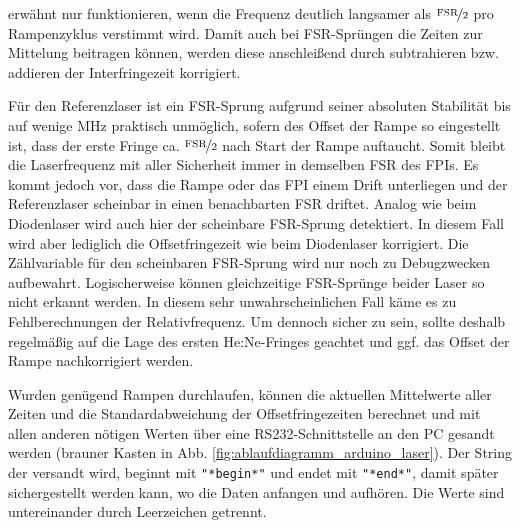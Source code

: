erwähnt nur funktionieren, wenn die Frequenz deutlich langsamer als
$\nicefrac{\text{FSR}}{2}$ pro Rampenzyklus verstimmt wird. Damit auch bei
FSR-Sprüngen die Zeiten zur Mittelung beitragen können, werden diese anschleißend durch subtrahieren bzw. addieren der Interfringezeit korrigiert.\par
Für den Referenzlaser ist ein FSR-Sprung aufgrund seiner absoluten Stabilität
bis auf wenige MHz praktisch unmöglich, sofern des Offset der Rampe so
eingestellt ist, dass der erste Fringe ca.
$\nicefrac{\text{FSR}}{2}$ nach Start der Rampe auftaucht. Somit bleibt die
Laserfrequenz mit aller Sicherheit immer in demselben FSR des FPIs. Es
kommt jedoch vor, dass die Rampe oder das FPI einem Drift unterliegen
und der Referenzlaser scheinbar in einen benachbarten FSR driftet.
Analog wie beim Diodenlaser wird auch hier der scheinbare FSR-Sprung
detektiert. In diesem Fall wird aber lediglich die Offsetfringezeit wie beim
Diodenlaser korrigiert. Die Zählvariable für den scheinbaren FSR-Sprung
wird nur noch zu Debugzwecken aufbewahrt. Logischerweise können
gleichzeitige FSR-Sprünge beider Laser so nicht erkannt werden. In diesem
sehr unwahrscheinlichen Fall käme es zu Fehlberechnungen der Relativfrequenz.
Um dennoch sicher zu sein, sollte deshalb regelmäßig auf die Lage des ersten
He:Ne-Fringes geachtet und ggf. das Offset der Rampe nachkorrigiert werden.\par
Wurden genügend Rampen durchlaufen, können die aktuellen Mittelwerte aller
Zeiten und die Standardabweichung der Offsetfringezeiten berechnet und mit allen
anderen nötigen Werten über eine RS232-Schnittstelle an den PC gesandt werden
(brauner Kasten in Abb.
\ref{fig:ablaufdiagramm_arduino_laser}). Der String der versandt wird, beginnt
mit \lstinline|"*begin*"| und endet mit \lstinline|"*end*"|, damit später
sichergestellt werden kann, wo die Daten anfangen und aufhören. Die Werte sind
untereinander durch Leerzeichen getrennt.


